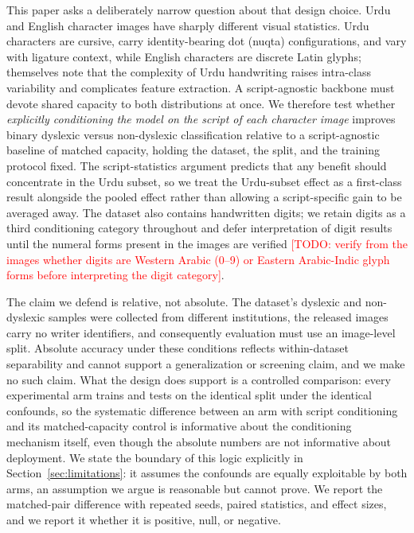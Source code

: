 \documentclass[11pt,a4paper]{article}
\newcommand{\todonote}[1]{\textcolor{red}{[TODO: #1]}}
\begin{document}
This paper asks a deliberately narrow question about that design
choice. Urdu and English character images have sharply different
visual statistics. Urdu characters are cursive, carry
identity-bearing dot (nuqta) configurations, and vary with ligature
context, while English characters are discrete Latin glyphs;
\citet{kashif2026} themselves note that the complexity of Urdu
handwriting raises intra-class variability and complicates feature
extraction. A script-agnostic backbone must devote shared capacity to
both distributions at once. We therefore test whether
\emph{explicitly conditioning the model on the script of each
character image} improves binary dyslexic versus non-dyslexic
classification relative to a script-agnostic baseline of matched
capacity, holding the dataset, the split, and the training protocol
fixed. The script-statistics argument predicts that any benefit
should concentrate in the Urdu subset, so we treat the Urdu-subset
effect as a first-class result alongside the pooled effect rather
than allowing a script-specific gain to be averaged away. The
dataset also contains handwritten digits; we retain digits as a third
conditioning category throughout and defer interpretation of digit
results until the numeral forms present in the images are verified
\todonote{verify from the images whether digits are Western Arabic
(0--9) or Eastern Arabic-Indic glyph forms before interpreting the
digit category}.

The claim we defend is relative, not absolute. The dataset's dyslexic
and non-dyslexic samples were collected from different institutions,
the released images carry no writer identifiers, and consequently
evaluation must use an image-level split. Absolute accuracy under
these conditions reflects within-dataset separability and cannot
support a generalization or screening claim, and we make no such
claim. What the design does support is a controlled comparison: every
experimental arm trains and tests on the identical split under the
identical confounds, so the systematic difference between an arm with
script conditioning and its matched-capacity control is informative
about the conditioning mechanism itself, even though the absolute
numbers are not informative about deployment. We state the boundary
of this logic explicitly in Section~\ref{sec:limitations}: it assumes
the confounds are equally exploitable by both arms, an assumption we
argue is reasonable but cannot prove. We report the matched-pair
difference with repeated seeds, paired statistics, and effect sizes,
and we report it whether it is positive, null, or negative.
\end{document}
